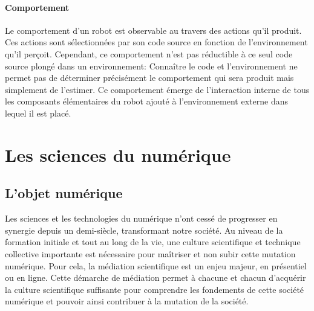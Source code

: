         \paragraph{Comportement}
            Le comportement d'un robot est observable au travers des actions qu'il produit. Ces actions sont sélectionnées par son code source en fonction de l'environnement qu'il perçoit. Cependant, ce comportement n'est pas réductible à ce seul code source plongé dans un environnement: Connaître le code et l'environnement ne permet pas de déterminer précisément le comportement qui sera produit mais simplement de l'estimer. Ce comportement émerge de l'interaction interne de tous les composants élémentaires du robot ajouté à l'environnement externe dans lequel il est placé. 
\section{Les sciences du numérique}\label{sec:num-concept}
    \subsection{L'objet numérique}
        Les sciences et les technologies du numérique n'ont cessé de progresser en synergie depuis un demi-siècle, transformant notre société.
        Au niveau de la formation initiale et tout au long de la vie, une culture scientifique et technique collective importante est nécessaire pour maîtriser et non subir cette mutation numérique.
        Pour cela, la médiation scientifique est un enjeu majeur, en présentiel ou en ligne. Cette démarche de médiation permet à chacune et chacun d'acquérir la culture scientifique suffisante pour comprendre les fondements de cette société numérique et pouvoir ainsi contribuer à la mutation de la société.
